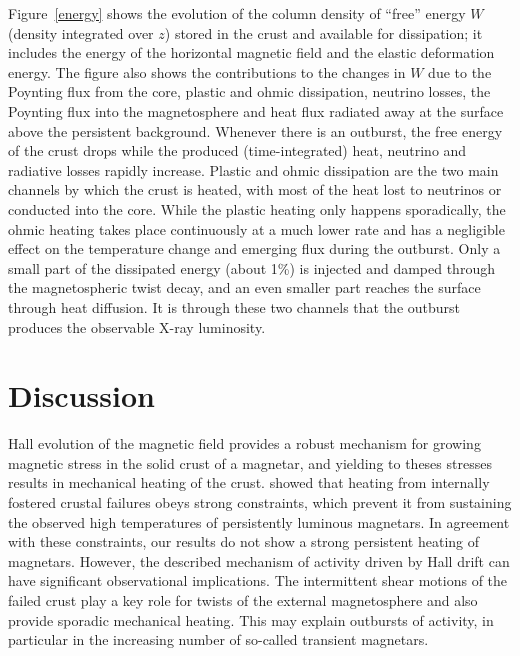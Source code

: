 Figure~\ref{energy} shows the evolution of the column density of ``free'' energy $W$ (density integrated over $z$) stored in the crust and available for dissipation; it includes the energy of the horizontal magnetic field and the elastic deformation energy. 
The figure also shows the contributions to the changes in $W$ due to the Poynting flux from the core, plastic and ohmic dissipation, neutrino losses, the Poynting flux into the magnetosphere and heat flux radiated away at the surface above the persistent background.
Whenever there is an outburst, the free energy of the crust drops while the produced (time-integrated) heat, neutrino and radiative losses rapidly increase. 
Plastic and ohmic dissipation are the two main channels by which the crust is heated, with most of the heat lost to neutrinos or conducted into the core. While the plastic heating only happens sporadically, the ohmic heating takes place continuously at a much lower  rate and has a negligible effect on the temperature change and emerging flux during the outburst. 
Only a small part of the dissipated energy (about 1\%) is injected and damped through the magnetospheric twist decay, and an even smaller part reaches the surface through heat diffusion.
It is through these two channels that the outburst produces the observable X-ray luminosity.

\section{Discussion}\label{discussion}


Hall evolution of the magnetic field provides a robust mechanism for growing 
magnetic stress in the solid crust of a magnetar, and yielding to theses stresses results in mechanical heating of the crust. 
\citet{2016ApJ...833..261B} showed that heating from internally fostered crustal failures obeys strong constraints, which prevent it from sustaining the observed high temperatures of persistently luminous magnetars. 
In agreement with these constraints, our results do not show a strong persistent heating of magnetars. 
However, the described mechanism of activity driven by Hall drift can have significant observational implications. 
The intermittent shear motions of the failed crust play a key role for twists of the external magnetosphere and also provide sporadic mechanical heating. 
This may explain outbursts of activity, in particular in the increasing number of so-called transient magnetars.

